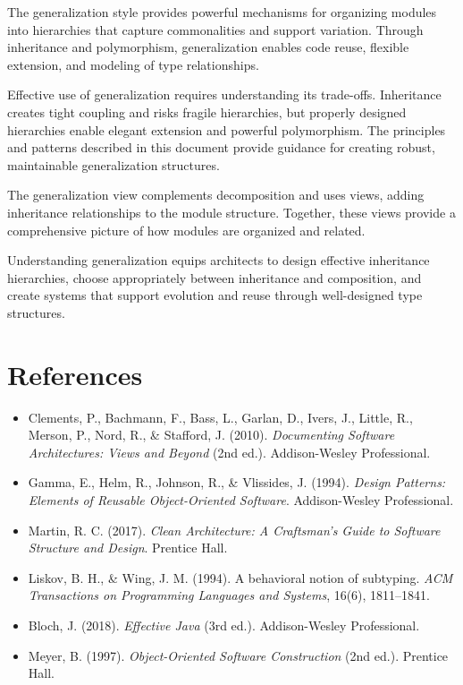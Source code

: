 \documentclass[11pt]{article}
\begin{document}
The generalization style provides powerful mechanisms for organizing modules into hierarchies that capture commonalities and support variation. Through inheritance and polymorphism, generalization enables code reuse, flexible extension, and modeling of type relationships.

Effective use of generalization requires understanding its trade-offs. Inheritance creates tight coupling and risks fragile hierarchies, but properly designed hierarchies enable elegant extension and powerful polymorphism. The principles and patterns described in this document provide guidance for creating robust, maintainable generalization structures.

The generalization view complements decomposition and uses views, adding inheritance relationships to the module structure. Together, these views provide a comprehensive picture of how modules are organized and related.

Understanding generalization equips architects to design effective inheritance hierarchies, choose appropriately between inheritance and composition, and create systems that support evolution and reuse through well-designed type structures.

\section*{References}

\begin{itemize}
  \item Clements, P., Bachmann, F., Bass, L., Garlan, D., Ivers, J., Little, R., Merson, P., Nord, R., \& Stafford, J. (2010). \textit{Documenting Software Architectures: Views and Beyond} (2nd ed.). Addison-Wesley Professional.
  \item Gamma, E., Helm, R., Johnson, R., \& Vlissides, J. (1994). \textit{Design Patterns: Elements of Reusable Object-Oriented Software}. Addison-Wesley Professional.
  \item Martin, R. C. (2017). \textit{Clean Architecture: A Craftsman's Guide to Software Structure and Design}. Prentice Hall.
  \item Liskov, B. H., \& Wing, J. M. (1994). A behavioral notion of subtyping. \textit{ACM Transactions on Programming Languages and Systems}, 16(6), 1811--1841.
  \item Bloch, J. (2018). \textit{Effective Java} (3rd ed.). Addison-Wesley Professional.
  \item Meyer, B. (1997). \textit{Object-Oriented Software Construction} (2nd ed.). Prentice Hall.
\end{itemize}

\listoffigures
\end{document}
